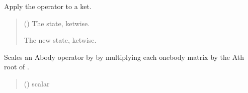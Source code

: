 \documentclass[letterpaper,10pt,english]{sphinxmanual}
\begin{document}
\begin{fulllineitems}
\begin{fulllineitems}
\label{\detokenize{spinbox:spinbox.core.ProductOperator.multiply_state}}
\pysigstartsignatures
{}
\pysigstopsignatures
\sphinxAtStartPar
Apply the operator to a  ket.
\begin{quote}\begin{description}
\sphinxAtStartPar
{} ({\hyperref[\detokenize{spinbox:spinbox.core.ProductState}]{}}) \textendash{} The state, ketwise.

\sphinxAtStartPar
The new state, ketwise.

\sphinxAtStartPar
{\hyperref[\detokenize{spinbox:spinbox.core.ProductState}]{}}

\end{description}\end{quote}

\end{fulllineitems}


\begin{fulllineitems}
\label{\detokenize{spinbox:spinbox.core.ProductOperator.scale_all}}
\pysigstartsignatures
{}
\pysigstopsignatures
\sphinxAtStartPar
Scales an A\sphinxhyphen{}body operator by  by multiplying each one\sphinxhyphen{}body matrix by the Ath root of .
\begin{quote}\begin{description}
\sphinxAtStartPar
{} () \textendash{} scalar


\end{description}
\end{quote}
\end{fulllineitems}
\end{fulllineitems}
\end{document}
